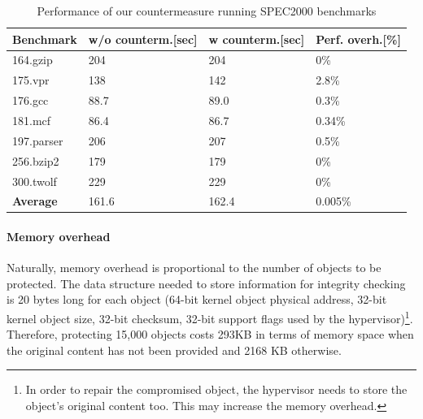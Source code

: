 \begin{table}%
\addtolength{\belowcaptionskip}{-3mm}
\begin{center}
\begin{tabular}{|l|l|l|l|}
\hline
\bf{Benchmark} & \bf{w/o counterm.}[sec] & \bf{w counterm.}[sec] & \bf{Perf. overh.}[\%] \\
\hline
164.gzip & 204 &  204 &  0\% \\
\hline
175.vpr  &  138 & 142 &  2.8\%\\
\hline
176.gcc  & 88.7 & 89.0 &  0.3\% \\
\hline
181.mcf   & 86.4 & 86.7 & 0.34\%  \\
\hline
197.parser & 206 & 207 & 0.5\% \\
\hline
256.bzip2  & 179  &  179 & 0\% \\
\hline
300.twolf  & 229 & 229 &  0\% \\
\hline
\textbf{Average} & 161.6 & 162.4 & 0.005\%\\
\hline
\end{tabular}
\end{center}
\caption{{Performance of our countermeasure running SPEC2000 benchmarks}}
\label{specbench}
\end{table}

\newpage



\paragraph{Memory overhead} \label{memory}
Naturally, memory overhead is proportional to the number of objects to be protected. The data structure needed to store information for integrity checking is 20 bytes long for each object (64-bit kernel object physical address, 32-bit kernel object size, 32-bit checksum, 32-bit support flags used by the hypervisor)\footnote{In order to repair the compromised object, the hypervisor needs to store the object's original content too. This may increase the memory overhead.}.  
Therefore, protecting 15,000 objects costs 293KB in terms of memory space when the original content has not been provided and 2168 KB otherwise. 

